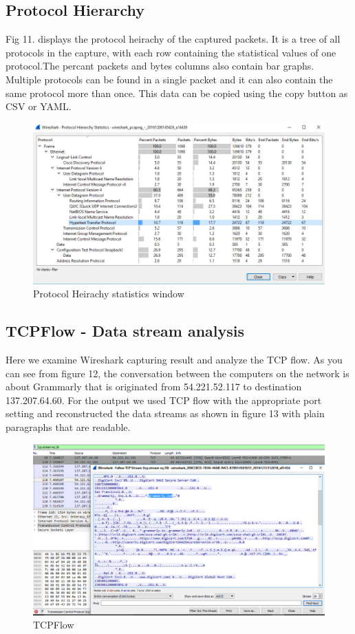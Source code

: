 \documentclass{article}
\begin{document}
\subsection{Protocol Hierarchy}
Fig 11. displays the protocol heirachy of the captured packets. It is a tree of all protocols in the capture, with each row containing the statistical values of one protocol.The percant packets and bytes columns also contain bar graphs. Multiple protocols can be found in a single packet and it can also contain the same protocol more than once. This data can be copied using the copy button as CSV or YAML.
\begin{figure}[H]
	\begin{center}
		\includegraphics[width=0.6
\textwidth]{Hierarchyst.jpg}
	\end{center}
	\caption{\small  Protocol Heirachy statistics window\newline}
	\label{fig:Prd}
\end{figure}


\subsection{TCPFlow - Data stream analysis}
Here we examine Wireshark capturing result and analyze the TCP flow. As you can see from figure 12, the conversation between the computers on the network is about Grammarly that is originated from 54.221.52.117 to destination 137.207.64.60. For the output we used TCP flow with the appropriate port setting and reconstructed the data streams as shown in figure 13 with plain paragraphs that are readable. 
\begin{figure}[H]
	\begin{center}
		\includegraphics[width=0.6
\textwidth]{TCPFLOW1.png}
	\end{center}
	\caption{TCPFlow}
	\label{fig:Prd}
\end{figure}
\end{document}

